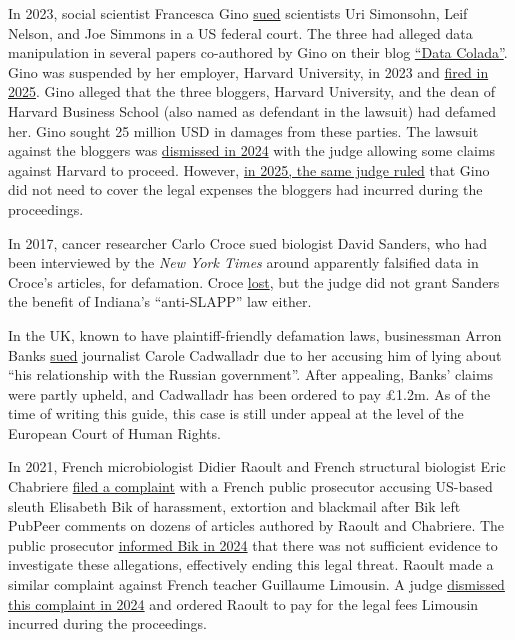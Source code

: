 \documentclass[letterpaper, 12pt]{article}
\begin{document}
In 2023, social scientist Francesca Gino \href{https://www.science.org/content/article/honesty-researcher-facing-fraud-concerns-sues-harvard-and-accusers-25-million}{sued} scientists Uri Simonsohn, Leif Nelson, and Joe Simmons in a US federal court. The three had alleged data manipulation in several papers co-authored by Gino on their blog \href{https://datacolada.org/}{``Data Colada''}. Gino was suspended by her employer, Harvard University, in 2023 and \href{https://www.theguardian.com/education/2025/may/27/harvard-professor-on-leave-falsified-ethics-data}{fired in 2025}. Gino alleged that the three bloggers, Harvard University, and the dean of Harvard Business School (also named as defendant in the lawsuit) had defamed her. Gino sought 25 million USD in damages from these parties. The lawsuit against the bloggers was \href{https://doi.org/10.1126/science.zciy6ft}{dismissed in 2024} with the judge allowing some claims against Harvard to proceed. However, \href{https://www.thecrimson.com/article/2025/7/12/gino-data-colada-legal-fees/}{in 2025, the same judge ruled} that Gino did not need to cover the legal expenses the bloggers had incurred during the proceedings.

In 2017, cancer researcher Carlo Croce sued biologist David Sanders, who had been interviewed by the \textit{New York Times} around apparently falsified data in Croce's articles, for defamation. Croce \href{https://retractionwatch.com/2020/05/13/cancer-researcher-loses-defamation-suit-against-critic/}{lost}, but the judge did not grant Sanders the benefit of Indiana's ``anti-SLAPP'' law either.

In the UK, known to have plaintiff-friendly defamation laws, businessman Arron Banks \href{https://www.bbc.com/news/uk-65644475}{sued} journalist Carole Cadwalladr due to her accusing him of lying about ``his relationship with the Russian government''.
After appealing, Banks' claims were partly upheld, and Cadwalladr has been ordered to pay £1.2m.
As of the time of writing this guide, this case is still under appeal at the level of the European Court of Human Rights.

In 2021, French microbiologist Didier Raoult and French structural biologist Eric Chabriere \href{https://doi.org/10.1038/d41586-021-01430-z}{filed a complaint} with a French public prosecutor accusing US-based sleuth Elisabeth Bik of harassment, extortion and blackmail after Bik left PubPeer comments on dozens of articles authored by Raoult and Chabriere. The public prosecutor \href{https://www.chemistryworld.com/news/integrity-specialist-has-no-case-to-answer-over-blackmail-extortion-allegations-french-officials-find/4019469.article}{informed Bik in 2024} that there was not sufficient evidence to investigate these allegations, effectively ending this legal threat. Raoult made a similar complaint against French teacher Guillaume Limousin. A judge \href{https://www.lexpress.fr/sciences-sante/guillaume-limousin-le-petit-prof-contre-didier-raoult-on-peut-tous-faire-bouger-les-choses-7XXE77HMTNBGVI4D6O5UDBVO7Y/}{dismissed this complaint in 2024} and ordered Raoult to pay for the legal fees Limousin incurred during the proceedings.
\end{document}
